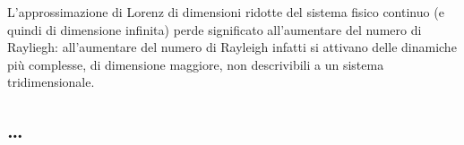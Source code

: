 \vspace{0.3cm}
\noindent
L'approssimazione di Lorenz di dimensioni ridotte del sistema fisico continuo (e quindi
 di dimensione infinita) perde significato all'aumentare del numero di Rayliegh: all'aumentare
 del numero di Rayleigh infatti si attivano delle dinamiche più complesse, di dimensione
 maggiore, non descrivibili a un sistema tridimensionale.











\subsection{\dots}
